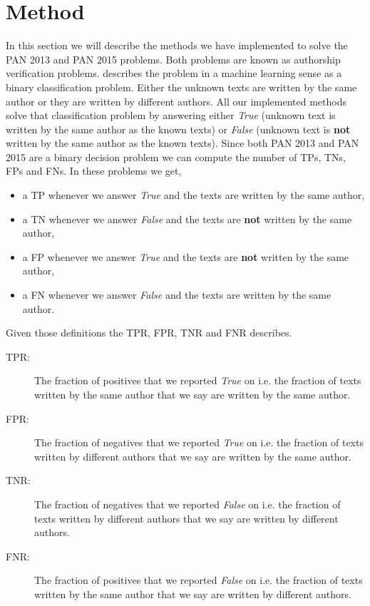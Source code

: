 \section{Method} \label{sec:method} 

In this section we will describe the methods we have implemented to solve
the PAN 2013 and PAN 2015 problems. Both problems are known as authorship
verification problems. \cite{stamatos2009} describes the problem in a machine
learning sense as a binary classification problem. Either the unknown texts
are written by the same author or they are written by different authors. All
our implemented methods solve that classification problem by answering either
\textit{True} (unknown text is written by the same author as the known texts)
or \textit{False} (unknown text is \textbf{not} written by the same author as
the known texts). Since both PAN 2013 and PAN 2015 are a binary decision problem
we can compute the number of \gls{TP}s, \gls{TN}s, \gls{FP}s and \gls{FN}s. In
these problems we get,

\begin{itemize}
    \item a \gls{TP} whenever we answer \textit{True} and the texts are written
        by the same author,
    \item a \gls{TN} whenever we answer \textit{False} and the texts are
        \textbf{not} written by the same author,
    \item a \gls{FP} whenever we answer \textit{True} and the texts are
        \textbf{not} written by the same author,
    \item a \gls{FN} whenever we answer \textit{False} and the texts are written
        by the same author.
\end{itemize}

Given those definitions the \gls{TPR}, \gls{FPR}, \gls{TNR} and \gls{FNR}
describes.

\begin{description}
    \item[\gls{TPR}: ] The fraction of positives that we reported \textit{True}
        on i.e. the fraction of texts written by the same author that we say are
        written by the same author.
    \item[\gls{FPR}: ] The fraction of negatives that we reported \textit{True}
        on i.e. the fraction of texts written by different authors that we say
        are written by the same author.
    \item[\gls{TNR}: ] The fraction of negatives that we reported \textit{False}
        on i.e. the fraction of texts written by different authors that we say
        are written by different authors.
    \item[\gls{FNR}: ] The fraction of positives that we reported \textit{False}
        on i.e. the fraction of texts written by the same author that we say are
        written by different authors.
\end{description}

